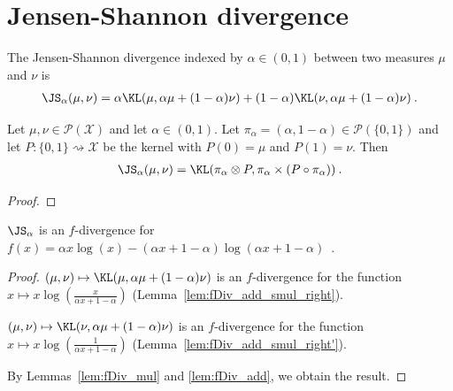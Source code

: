 \section{Jensen-Shannon divergence}

\begin{definition}
  \label{def:jensenShannon}
  The Jensen-Shannon divergence indexed by $\alpha \in (0,1)$ between two measures $\mu$ and $\nu$ is
  \begin{align*}
    \JS_\alpha(\mu, \nu) = \alpha \KL(\mu, \alpha \mu + (1 - \alpha)\nu) + (1 - \alpha) \KL(\nu, \alpha \mu + (1 - \alpha)\nu) \: .
  \end{align*}
\end{definition}


\begin{lemma}
  \label{lem:jensenShannon_eq_kl}
  Let $\mu, \nu \in \mathcal P(\mathcal X)$ and let $\alpha \in (0, 1)$. Let $\pi_\alpha = (\alpha, 1 - \alpha) \in \mathcal P(\{0,1\})$ and let $P : \{0,1\} \rightsquigarrow \mathcal X$ be the kernel with $P(0) = \mu$ and $P(1) = \nu$. Then
  \begin{align*}
  \JS_\alpha(\mu, \nu) = \KL(\pi_\alpha \otimes P, \pi_\alpha \times (P \circ \pi_\alpha)) \: .
  \end{align*}
\end{lemma}

\begin{proof}%
\uses{}

\end{proof}


\begin{lemma}
  \label{lem:jensenShannon_eq_fDiv}
  $\JS_\alpha$ is an $f$-divergence for $f(x) = \alpha x \log(x) - (\alpha x + 1 - \alpha) \log (\alpha x + 1 - \alpha)$~.
\end{lemma}

\begin{proof}%
{}
$(\mu, \nu) \mapsto \KL(\mu, \alpha \mu + (1 - \alpha) \nu)$ is an $f$-divergence for the function $x \mapsto x\log\left(\frac{x}{\alpha x + 1 - \alpha}\right)$ (Lemma~\ref{lem:fDiv_add_smul_right}).

$(\mu, \nu) \mapsto \KL(\nu, \alpha \mu + (1 - \alpha) \nu)$ is an $f$-divergence for the function $x \mapsto x\log\left(\frac{1}{\alpha x + 1 - \alpha}\right)$ (Lemma~\ref{lem:fDiv_add_smul_right'}).

By Lemmas~\ref{lem:fDiv_mul} and \ref{lem:fDiv_add}, we obtain the result.
\end{proof}


